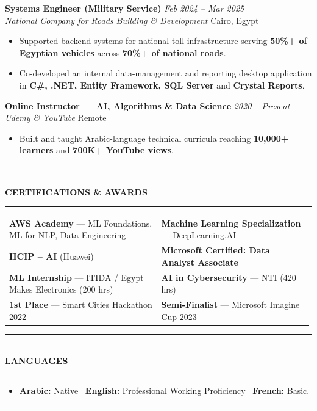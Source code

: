 \documentclass[10pt, a4paper]{article}
\makeatletter
\newcommand{\cvsection}[1]{%
  \vspace{3pt}%
  {\color{navy}\rule{\linewidth}{1.1pt}}\\[0.5pt]%
  {\color{navy}\bfseries\fontsize{9.5}{11}\selectfont\uppercase{#1}}\\[-4pt]%
  {\color{teal}\rule{\linewidth}{0.6pt}}%
  \vspace{2pt}%
}
\newcommand{\cventry}[4]{%
  \vspace{2.5pt}%
  \textbf{\color{darkgray}#1} \hfill {\color{midgray}\textit{#3}}\\[-1.5pt]%
  {\color{teal}\textit{#2}} \hfill {\color{midgray}#4}%
}
\newenvironment{cvitems}{%
  \begin{itemize}[leftmargin=11pt, itemsep=0.5pt, parsep=0pt, topsep=1pt,
                  label={\textcolor{teal}{$\bullet$}}]
}{%
  \end{itemize}%
}
\newenvironment{dualcol}{%
  \begin{tabular*}{\linewidth}{@{}p{0.495\linewidth}@{\hspace{0.01\linewidth}}p{0.495\linewidth}@{}}
}{%
  \end{tabular*}%
}
\makeatother
\begin{document}
\cventry{Systems Engineer (Military Service)}{National Company for Roads Building \& Development}
        {Feb 2024 -- Mar 2025}{Cairo, Egypt}
\begin{cvitems}
  \item Supported backend systems for national toll infrastructure serving \textbf{50\%+ of Egyptian vehicles} across \textbf{70\%+ of national roads}.
  \item Co-developed an internal data-management and reporting desktop application in \textbf{C\#, .NET, Entity Framework, SQL Server} and \textbf{Crystal Reports}.
\end{cvitems}

\cventry{Online Instructor --- AI, Algorithms \& Data Science}{Udemy \& YouTube}
        {2020 -- Present}{Remote}
\begin{cvitems}
  \item Built and taught Arabic-language technical curricula reaching \textbf{10,000+ learners} and \textbf{700K+ YouTube views}.
\end{cvitems}

\cvsection{Certifications \& Awards}

\begin{dualcol}
  \textbf{AWS Academy} --- ML Foundations, ML for NLP, Data Engineering &
  \textbf{Machine Learning Specialization} --- DeepLearning.AI \\[2pt]
  \textbf{HCIP -- AI} (Huawei) &
  \textbf{Microsoft Certified: Data Analyst Associate} \\[2pt]
  \textbf{ML Internship} --- ITIDA / Egypt Makes Electronics (200 hrs) &
  \textbf{AI in Cybersecurity} --- NTI (420 hrs) \\[2pt]
  \textbf{1st Place} --- Smart Cities Hackathon 2022 &
  \textbf{Semi-Finalist} --- Microsoft Imagine Cup 2023 \\
\end{dualcol}

\cvsection{Languages}

\begin{cvitems}
  \item \textbf{Arabic:} Native \textperiodcentered\ \textbf{English:} Professional Working Proficiency \textperiodcentered\ \textbf{French:} Basic.
\end{cvitems}

\vspace{3pt}
{\color{navy}\rule{\linewidth}{0.8pt}}
\end{document}
